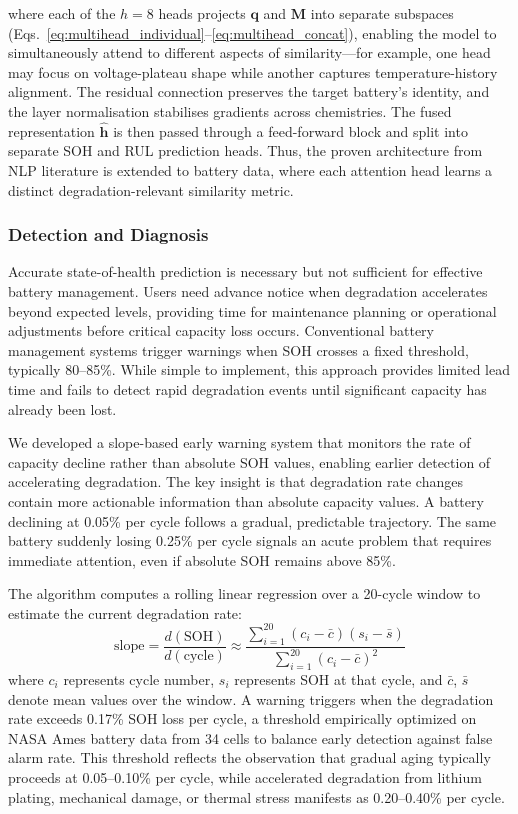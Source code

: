 \documentclass[5p,times,authoryear]{elsarticle}
\begin{document}
where each of the $h{=}8$ heads projects $\mathbf{q}$ and $\mathbf{M}$ into separate subspaces (Eqs.~\ref{eq:multihead_individual}--\ref{eq:multihead_concat}), enabling the model to simultaneously attend to different aspects of similarity---for example, one head may focus on voltage-plateau shape while another captures temperature-history alignment. The residual connection preserves the target battery's identity, and the layer normalisation stabilises gradients across chemistries. The fused representation $\hat{\mathbf{h}}$ is then passed through a feed-forward block and split into separate SOH and RUL prediction heads. Thus, the proven architecture from NLP literature is extended to battery data, where each attention head learns a distinct degradation-relevant similarity metric.




\subsubsection{Detection and Diagnosis}

Accurate state-of-health prediction is necessary but not sufficient for effective battery management. Users need advance notice when degradation accelerates beyond expected levels, providing time for maintenance planning or operational adjustments before critical capacity loss occurs. Conventional battery management systems trigger warnings when SOH crosses a fixed threshold, typically 80--85\%. While simple to implement, this approach provides limited lead time and fails to detect rapid degradation events until significant capacity has already been lost.

We developed a slope-based early warning system that monitors the rate of capacity decline rather than absolute SOH values, enabling earlier detection of accelerating degradation. The key insight is that degradation rate changes contain more actionable information than absolute capacity values. A battery declining at 0.05\% per cycle follows a gradual, predictable trajectory. The same battery suddenly losing 0.25\% per cycle signals an acute problem that requires immediate attention, even if absolute SOH remains above 85\%.

The algorithm computes a rolling linear regression over a 20-cycle window to estimate the current degradation rate:
\begin{equation}
\text{slope} = \frac{d(\text{SOH})}{d(\text{cycle})} \approx \frac{\sum_{i=1}^{20} (c_i - \bar{c})(s_i - \bar{s})}{\sum_{i=1}^{20} (c_i - \bar{c})^2}
\end{equation}
where $c_i$ represents cycle number, $s_i$ represents SOH at that cycle, and $\bar{c}$, $\bar{s}$ denote mean values over the window. A warning triggers when the degradation rate exceeds 0.17\% SOH loss per cycle, a threshold empirically optimized on NASA Ames battery data from 34 cells to balance early detection against false alarm rate. This threshold reflects the observation that gradual aging typically proceeds at 0.05--0.10\% per cycle, while accelerated degradation from lithium plating, mechanical damage, or thermal stress manifests as 0.20--0.40\% per cycle.
\end{document}
